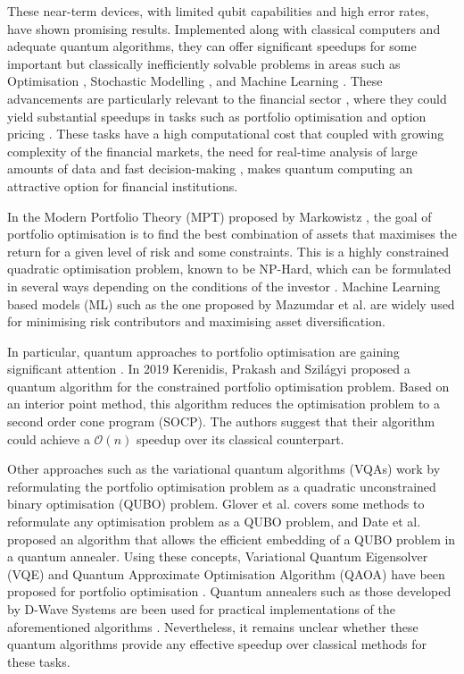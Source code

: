 \documentclass[prx,twocolumn,floatfix,superscriptaddress,longbibliography]{revtex4-1}
\begin{document}
These near-term devices, with limited qubit capabilities and high error rates, have shown promising results. Implemented along with classical computers and adequate quantum algorithms, they can offer significant speedups for some important but classically inefficiently solvable problems in areas such as Optimisation \cite{Symons2023}, Stochastic Modelling \cite{Herbert2022}, and Machine Learning \cite{Zeguendry2023}. These advancements are particularly relevant to the financial sector \cite{Egger2020a}, where they could yield substantial speedups in tasks such as portfolio optimisation and option pricing \cite{Hassija2020}. These tasks have a high 
computational cost that coupled with growing complexity of the financial markets, the need for real-time analysis of large amounts of data and fast decision-making \cite{book:2139036}, makes quantum computing 
an attractive option for financial institutions. 

In the Modern Portfolio Theory (MPT) proposed by Markowistz \cite{Markowitz1952}, the goal of portfolio optimisation is to find the best combination of assets that maximises the return for a given level of risk and some constraints. This is a highly constrained quadratic optimisation problem, known to be NP-Hard, which can be formulated in several ways depending on the conditions of the 
investor \cite{Herman2022}. Machine Learning based models (ML) such as the one proposed by Mazumdar et al. \cite{Mazumdar2020} are widely used for minimising risk contributors and maximising asset diversification.

In particular, quantum approaches to portfolio optimisation are gaining significant attention \cite{Quarterly2020}. In 2019 Kerenidis, Prakash and Szilágyi proposed a quantum algorithm for the constrained portfolio optimisation problem. Based on an interior point method, this algorithm reduces the optimisation problem to a second order cone program (SOCP). The authors suggest that their algorithm could achieve a $\mathcal{O} (n)$ speedup over  its classical counterpart.

Other approaches such as the variational quantum algorithms (VQAs) \cite{Yuan2019, Cerezo2021, McClean2016, Amaro2022} work by reformulating the portfolio optimisation problem as a 
quadratic unconstrained binary optimisation (QUBO) problem. Glover et al. \cite{Glover2019} covers some methods to reformulate any optimisation problem as a QUBO problem, and Date et al. \cite{Date2019} proposed an algorithm that allows the efficient embedding of a QUBO problem in a quantum annealer.  Using these concepts, Variational Quantum 
Eigensolver (VQE) \cite{Huang2023, McClean2016, Peruzzo2014, Barkoutsos2020, Buonaiuto2023} and Quantum Approximate Optimisation Algorithm (QAOA) \cite{Farhi2014, Blekos2024} have been proposed for portfolio optimisation \cite{Egger2020}. Quantum annealers such as those developed by D-Wave Systems \cite{King2023} are been used for practical implementations of the aforementioned algorithms
\cite{Yarkoni2022, Phillipson2020, Venturelli2019}. Nevertheless, it remains unclear whether these quantum algorithms provide any effective speedup over classical methods for these tasks.
\end{document}
